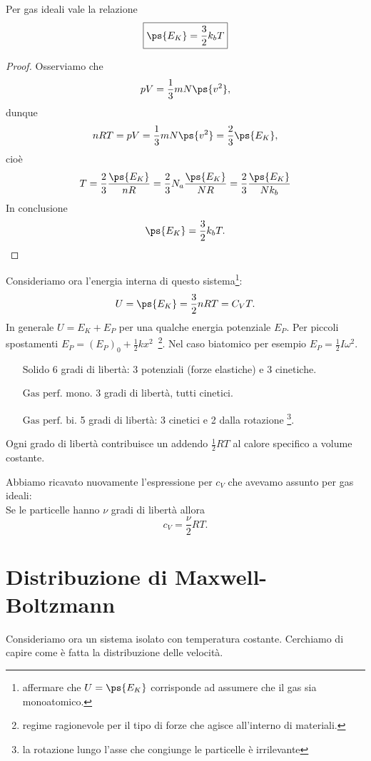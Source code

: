 \begin{proposition}
Per gas ideali vale la relazione
\[\boxed{\ps{E_K}=\frac32 k_b T}\]
\end{proposition}
\begin{proof}
Osserviamo che
\[pV=\frac13 mN\ps{v^2},\]
dunque
\[nRT=pV=\frac13 mN\ps{v^2}=\frac23\ps{E_K},\]
cio\`e
\[T=\frac 23\frac{\ps{E_K}}{nR}=\frac 23N_a\frac{\ps{E_K}}{NR}=\frac 23\frac{\ps{E_K}}{Nk_b}\]
In conclusione
\[\ps{E_K}=\frac32 k_b T.\]
\end{proof}

\noindent
Consideriamo ora l'energia interna di questo sistema\footnote{affermare che $U=\ps{E_K}$ corrisponde ad assumere che il gas sia monoatomico.}:
\[U=\ps{E_K}=\frac32nRT=C_VT.\]
In generale $U=E_K+E_P$ per una qualche energia potenziale $E_P$. Per piccoli spostamenti $E_P=(E_P)_0+\frac12kx^2$\ \footnote{regime ragionevole per il tipo di forze che agisce all'interno di materiali.}. Nel caso biatomico per esempio $E_P=\frac12I\omega^2$.
\setlength{\leftmargini}{0cm}
\begin{itemize}
\item[$\boxed{\text{Solido}}$] 6 gradi di libert\`a: 3 potenziali (forze elastiche) e 3 cinetiche.
\item[$\boxed{\text{Gas perf. mono.}}$] 3 gradi di libert\`a, tutti cinetici.
\item[$\boxed{\text{Gas perf. bi.}}$] 5 gradi di libert\`a: 3 cinetici e 2 dalla rotazione \footnote{la rotazione lungo l'asse che congiunge le particelle \`e irrilevante}.
\end{itemize}
\setlength{\leftmargini}{0.5cm}


\begin{fact}
Ogni grado di libert\`a contribuisce un addendo $\frac12 RT$ al calore specifico a volume costante.
\end{fact}

\begin{remark}
Abbiamo ricavato nuovamente l'espressione per $c_V$ che avevamo assunto per gas ideali:\\
Se le particelle hanno $\nu$ gradi di libert\`a allora
\[c_V=\frac\nu2RT.\]
\end{remark}

\section{Distribuzione di Maxwell-Boltzmann}
Consideriamo ora un sistema isolato con temperatura costante. Cerchiamo di capire come \`e fatta la distribuzione delle velocit\`a.\medskip

